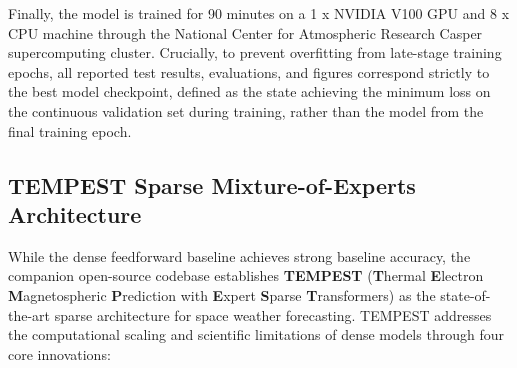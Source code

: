 \documentclass{agujournal2019}
\begin{document}
Finally, the model is trained for 90 minutes on a 1 x NVIDIA V100 GPU and 8 x CPU machine through the National Center for Atmospheric Research Casper supercomputing cluster. Crucially, to prevent overfitting from late-stage training epochs, all reported test results, evaluations, and figures correspond strictly to the best model checkpoint, defined as the state achieving the minimum loss on the continuous validation set during training, rather than the model from the final training epoch.

\subsection{TEMPEST Sparse Mixture-of-Experts Architecture}
\label{model:tempest}

While the dense feedforward baseline achieves strong baseline accuracy, the companion open-source codebase establishes \textbf{TEMPEST} (\textbf{T}hermal \textbf{E}lectron \textbf{M}agnetospheric \textbf{P}rediction with \textbf{E}xpert \textbf{S}parse \textbf{T}ransformers) as the state-of-the-art sparse architecture for space weather forecasting. TEMPEST addresses the computational scaling and scientific limitations of dense models through four core innovations:
\end{document}
